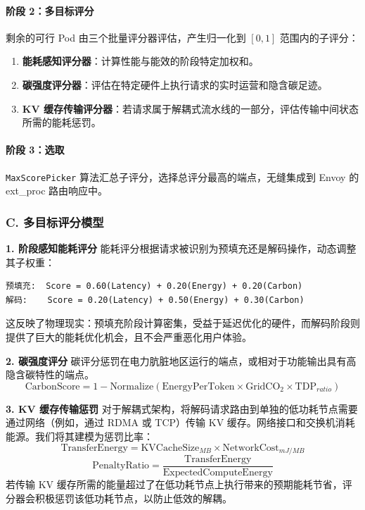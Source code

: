\paragraph{阶段 2：多目标评分}

剩余的可行 Pod 由三个批量评分器评估，产生归一化到 \([0, 1]\) 范围内的子评分：
\begin{enumerate}
    \item \textbf{能耗感知评分器}：计算性能与能效的阶段特定加权和。
    \item \textbf{碳强度评分器}：评估在特定硬件上执行请求的实时运营和隐含碳足迹。
    \item \textbf{KV 缓存传输评分器}：若请求属于解耦式流水线的一部分，评估传输中间状态所需的能耗惩罚。
\end{enumerate}

\paragraph{阶段 3：选取}

\texttt{MaxScorePicker} 算法汇总子评分，选择总评分最高的端点，无缝集成到 Envoy 的 ext\_proc 路由响应中。

\subsubsection{C. 多目标评分模型}\label{c.-multi-objective-scoring-models}

\textbf{1. 阶段感知能耗评分} 能耗评分根据请求被识别为预填充还是解码操作，动态调整其子权重：

\begin{verbatim}
预填充:  Score = 0.60(Latency) + 0.20(Energy) + 0.20(Carbon)
解码:    Score = 0.20(Latency) + 0.50(Energy) + 0.30(Carbon)
\end{verbatim}

这反映了物理现实：预填充阶段计算密集，受益于延迟优化的硬件，而解码阶段则提供了巨大的能耗优化机会，且不会严重恶化用户体验。

\textbf{2. 碳强度评分} 碳评分惩罚在电力肮脏地区运行的端点，或相对于功能输出具有高隐含碳特性的端点。
\[ \text{CarbonScore} = 1 - \text{Normalize}(\text{EnergyPerToken} \times \text{GridCO}_2 \times \text{TDP}_{ratio}) \]

\textbf{3. KV 缓存传输惩罚} 对于解耦式架构，将解码请求路由到单独的低功耗节点需要通过网络（例如，通过 RDMA 或 TCP）传输 KV 缓存。网络接口和交换机消耗能源。我们将其建模为惩罚比率：
\[ \text{TransferEnergy} = \text{KVCacheSize}_{MB} \times \text{NetworkCost}_{mJ/MB} \]
\[ \text{PenaltyRatio} = \frac{\text{TransferEnergy}}{\text{ExpectedComputeEnergy}} \]
若传输 KV 缓存所需的能量超过了在低功耗节点上执行带来的预期能耗节省，评分器会积极惩罚该低功耗节点，以防止低效的解耦。

